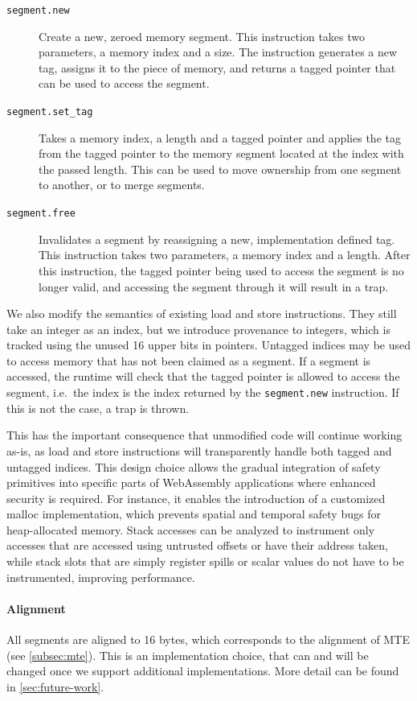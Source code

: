 \begin{description}
    \item[\texttt{segment.new}] Create a new, zeroed memory segment.
    This instruction takes two parameters, a memory index and a size.
    The instruction generates a new tag, assigns it to the piece of memory, and returns a tagged pointer that can be used to access the segment.
    \item[\texttt{segment.set\_tag}] Takes a memory index, a length and a tagged pointer and applies the tag from the tagged pointer to the memory segment located at the index with the passed length.
    This can be used to move ownership from one segment to another, or to merge segments.
    \item[\texttt{segment.free}] Invalidates a segment by reassigning a new, implementation defined tag.
    This instruction takes two parameters, a memory index and a length.
    After this instruction, the tagged pointer being used to access the segment is no longer valid, and accessing the segment through it will result in a trap.
\end{description}

We also modify the semantics of existing load and store instructions.
They still take an integer as an index, but we introduce provenance to integers, which is tracked using the unused 16 upper bits in pointers.
Untagged indices may be used to access memory that has not been claimed as a segment.
If a segment is accessed, the runtime will check that the tagged pointer is allowed to access the segment, i.e.\ the index is the index returned by the \texttt{segment.new} instruction.
If this is not the case, a trap is thrown.

This has the important consequence that unmodified code will continue working as-is, as load and store instructions will transparently handle both tagged and untagged indices.
This design choice allows the gradual integration of safety primitives into specific parts of WebAssembly applications where enhanced security is required.
For instance, it enables the introduction of a customized malloc implementation, which prevents spatial and temporal safety bugs for heap-allocated memory.
Stack accesses can be analyzed to instrument only accesses that are accessed using untrusted offsets or have their address taken, while stack slots that are simply register spills or scalar values do not have to be instrumented, improving performance.

\paragraph{Alignment}
All segments are aligned to 16 bytes, which corresponds to the alignment of MTE (see \cref{subsec:mte}).
This is an implementation choice, that can and will be changed once we support additional implementations.
More detail can be found in \cref{sec:future-work}.

